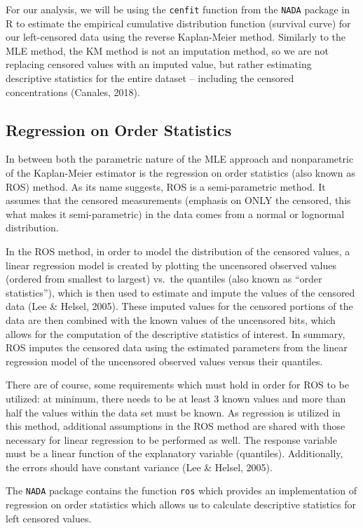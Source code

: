 \documentclass[12pt, twoside]{amherstthesis}
\begin{document}
For our analysis, we will be using the \texttt{cenfit} function from the \texttt{NADA} package in R to estimate the empirical cumulative distribution function (survival curve) for our left-censored data using the reverse Kaplan-Meier method. Similarly to the MLE method, the KM method is not an imputation method, so we are not replacing censored values with an imputed value, but rather estimating descriptive statistics for the entire dataset -- including the censored concentrations (Canales, 2018).

\hypertarget{ROS}{%
\subsection{Regression on Order Statistics}\label{ROS}}

In between both the parametric nature of the MLE approach and nonparametric of the Kaplan-Meier estimator is the regression on order statistics (also known as ROS) method. As its name suggests, ROS is a semi-parametric method. It assumes that the censored measurements (emphasis on ONLY the censored, this what makes it semi-parametric) in the data comes from a normal or lognormal distribution.

In the ROS method, in order to model the distribution of the censored values, a linear regression model is created by plotting the uncensored observed values (ordered from smallest to largest) vs.~the quantiles (also known as ``order statistics''), which is then used to estimate and impute the values of the censored data (Lee \& Helsel, 2005). These imputed values for the censored portions of the data are then combined with the known values of the uncensored bits, which allows for the computation of the descriptive statistics of interest. In summary, ROS imputes the censored data using the estimated parameters from the linear regression model of the uncensored observed values versus their quantiles.

There are of course, some requirements which must hold in order for ROS to be utilized: at minimum, there needs to be at least 3 known values and more than half the values within the data set must be known. As regression is utilized in this method, additional assumptions in the ROS method are shared with those necessary for linear regression to be performed as well. The response variable must be a linear function of the explanatory variable (quantiles). Additionally, the errors should have constant variance (Lee \& Helsel, 2005).

The \texttt{NADA} package contains the function \texttt{ros} which provides an implementation of regression on order statistics which allows us to calculate descriptive statistics for left censored values.
\end{document}
